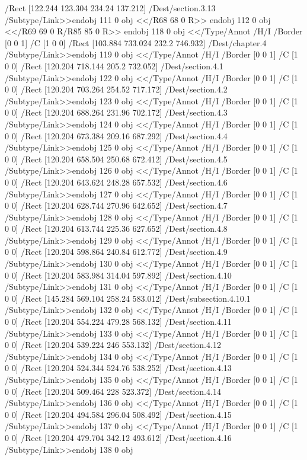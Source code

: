 {{{{{{{{{{{{{{{{{{{{{{{{{{{{/Rect [122.244 123.304 234.24 137.212]
/Dest/section.3.13
/Subtype/Link>>endobj
111 0 obj
<</R68
68 0 R>>
endobj
112 0 obj
<</R69
69 0 R/R85
85 0 R>>
endobj
118 0 obj
<</Type/Annot
/H/I
/Border [0 0 1]
/C [1 0 0]
/Rect [103.884 733.024 232.2 746.932]
/Dest/chapter.4
/Subtype/Link>>endobj
119 0 obj
<</Type/Annot
/H/I
/Border [0 0 1]
/C [1 0 0]
/Rect [120.204 718.144 205.2 732.052]
/Dest/section.4.1
/Subtype/Link>>endobj
122 0 obj
<</Type/Annot
/H/I
/Border [0 0 1]
/C [1 0 0]
/Rect [120.204 703.264 254.52 717.172]
/Dest/section.4.2
/Subtype/Link>>endobj
123 0 obj
<</Type/Annot
/H/I
/Border [0 0 1]
/C [1 0 0]
/Rect [120.204 688.264 231.96 702.172]
/Dest/section.4.3
/Subtype/Link>>endobj
124 0 obj
<</Type/Annot
/H/I
/Border [0 0 1]
/C [1 0 0]
/Rect [120.204 673.384 209.16 687.292]
/Dest/section.4.4
/Subtype/Link>>endobj
125 0 obj
<</Type/Annot
/H/I
/Border [0 0 1]
/C [1 0 0]
/Rect [120.204 658.504 250.68 672.412]
/Dest/section.4.5
/Subtype/Link>>endobj
126 0 obj
<</Type/Annot
/H/I
/Border [0 0 1]
/C [1 0 0]
/Rect [120.204 643.624 248.28 657.532]
/Dest/section.4.6
/Subtype/Link>>endobj
127 0 obj
<</Type/Annot
/H/I
/Border [0 0 1]
/C [1 0 0]
/Rect [120.204 628.744 270.96 642.652]
/Dest/section.4.7
/Subtype/Link>>endobj
128 0 obj
<</Type/Annot
/H/I
/Border [0 0 1]
/C [1 0 0]
/Rect [120.204 613.744 225.36 627.652]
/Dest/section.4.8
/Subtype/Link>>endobj
129 0 obj
<</Type/Annot
/H/I
/Border [0 0 1]
/C [1 0 0]
/Rect [120.204 598.864 240.84 612.772]
/Dest/section.4.9
/Subtype/Link>>endobj
130 0 obj
<</Type/Annot
/H/I
/Border [0 0 1]
/C [1 0 0]
/Rect [120.204 583.984 314.04 597.892]
/Dest/section.4.10
/Subtype/Link>>endobj
131 0 obj
<</Type/Annot
/H/I
/Border [0 0 1]
/C [1 0 0]
/Rect [145.284 569.104 258.24 583.012]
/Dest/subsection.4.10.1
/Subtype/Link>>endobj
132 0 obj
<</Type/Annot
/H/I
/Border [0 0 1]
/C [1 0 0]
/Rect [120.204 554.224 479.28 568.132]
/Dest/section.4.11
/Subtype/Link>>endobj
133 0 obj
<</Type/Annot
/H/I
/Border [0 0 1]
/C [1 0 0]
/Rect [120.204 539.224 246 553.132]
/Dest/section.4.12
/Subtype/Link>>endobj
134 0 obj
<</Type/Annot
/H/I
/Border [0 0 1]
/C [1 0 0]
/Rect [120.204 524.344 524.76 538.252]
/Dest/section.4.13
/Subtype/Link>>endobj
135 0 obj
<</Type/Annot
/H/I
/Border [0 0 1]
/C [1 0 0]
/Rect [120.204 509.464 228 523.372]
/Dest/section.4.14
/Subtype/Link>>endobj
136 0 obj
<</Type/Annot
/H/I
/Border [0 0 1]
/C [1 0 0]
/Rect [120.204 494.584 296.04 508.492]
/Dest/section.4.15
/Subtype/Link>>endobj
137 0 obj
<</Type/Annot
/H/I
/Border [0 0 1]
/C [1 0 0]
/Rect [120.204 479.704 342.12 493.612]
/Dest/section.4.16
/Subtype/Link>>endobj
138 0 obj
}}}}}}}}}}}}}}}}}}}}}}}}}}}}
